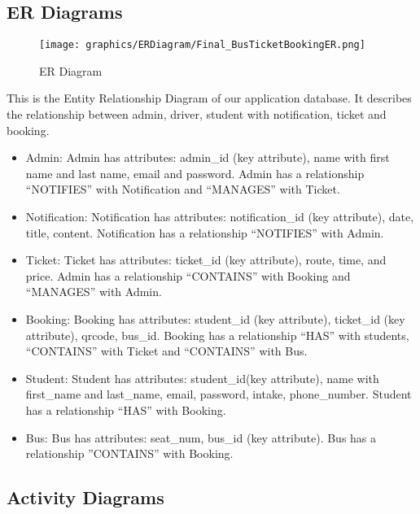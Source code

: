 \subsection{ER Diagrams}
    \begin{figure}[H]
        \centering
        \texttt{[image: graphics/ERDiagram/Final\_BusTicketBookingER.png]}
        \caption{ER Diagram}
        \label{fig:erdiagram}
    \end{figure}
\noindent This is the Entity Relationship Diagram of our application database. It describes the relationship between admin, driver, student with notification, ticket and booking. 
\begin{itemize}
    \item Admin: Admin has attributes: admin\_id (key attribute), name with first name and last name, email and password. Admin has a relationship “NOTIFIES” with Notification and “MANAGES” with Ticket.
    \item Notification: Notification has attributes: notification\_id (key attribute), date, title, content. Notification has a relationship “NOTIFIES” with Admin.
    \item Ticket: Ticket has attributes: ticket\_id (key attribute), route, time, and price. Admin has a relationship “CONTAINS” with Booking and “MANAGES” with Admin. 
    \item Booking: Booking has attributes: student\_id (key attribute), ticket\_id (key attribute), qrcode, bus\_id. Booking has a relationship “HAS” with students, “CONTAINS” with Ticket and “CONTAINS” with Bus.
    \item Student: Student has attributes: student\_id(key attribute), name with first\_name and last\_name, email, password, intake, phone\_number. Student has a relationship “HAS” with Booking.
    \item Bus: Bus has attributes: seat\_num, bus\_id (key attribute). Bus has a relationship ”CONTAINS” with Booking.
\end{itemize}

\subsection{Activity Diagrams}

